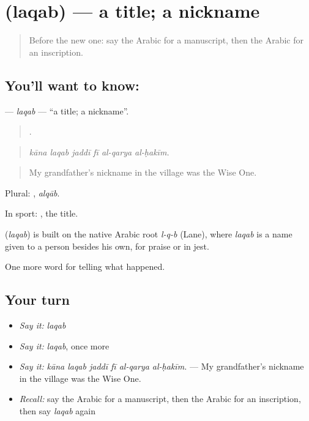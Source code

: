 \section[\texorpdfstring{\ar{لقب} (laqab)}{لقب (laqab)}]{ (laqab) — a title; a nickname}

\label{lesson:AR-C342-laqab}



\begin{quote}
Before the new one: say the Arabic for a manuscript, then the Arabic for an inscription.
\end{quote}

\subsection*{You'll want to know: }
\textbf{} — \emph{laqab} — \textquotedblleft{}a title; a nickname\textquotedblright{}.

\begin{quote}
     .
\end{quote}

\begin{quote}
\emph{kāna laqab jaddī fī al-qarya al-ḥakīm.}
\end{quote}

\begin{quote}
My grandfather’s nickname in the village was the Wise One.
\end{quote}

Plural: , \emph{alqāb}.

In sport:  , the title.

\begin{cousinweb}
\textbf{} (\emph{laqab}) is built on the native Arabic root \emph{l-q-b} (Lane), where \emph{laqab} is a name given to a person besides his own, for praise or in jest.
\end{cousinweb}

\begin{grammarlens}[title={What you've built}]
One more word for telling what happened.
\end{grammarlens}

\subsection*{Your turn}
\begin{itemize}
\raggedright
  \item \emph{Say it:} \emph{laqab}
  \item \emph{Say it:} \emph{laqab}, once more
  \item \emph{Say it:} \emph{kāna laqab jaddī fī al-qarya al-ḥakīm.} — My grandfather’s nickname in the village was the Wise One.
  \item \emph{Recall:} say the Arabic for a manuscript, then the Arabic for an inscription, then say \emph{laqab} again
\end{itemize}

